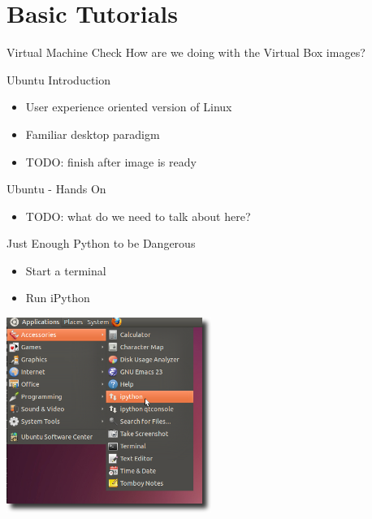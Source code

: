 \section{Basic Tutorials}

\begin{frame}{Virtual Machine Check}
How are we doing with the Virtual Box images?
\end{frame}

\begin{frame}{Ubuntu Introduction}
\begin{itemize}
  \item User experience oriented version of Linux
  \item Familiar desktop paradigm
  \item TODO: finish after image is ready
\end{itemize}
\end{frame}

\begin{frame}{Ubuntu - Hands On  }
\begin{itemize}
  \item TODO: what do we need to talk about here?
\end{itemize}
\end{frame}

\begin{frame}{Just Enough Python to be Dangerous}
\begin{itemize}
  \item Start a terminal
  \item Run iPython
\end{itemize}
\begin{center}
  \includegraphics[width=0.5\textwidth]{Images/iPythonLaunch_shadow}
\end{center}
\end{frame}

